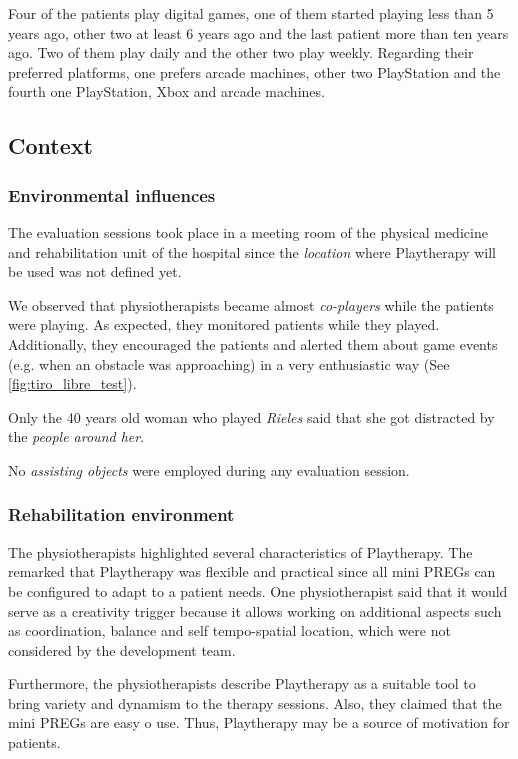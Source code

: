 Four of the patients play digital games, one of them started playing less than 5 years ago, other two at least 6 years ago and the last patient more than ten years ago. Two of them play daily and the other two play weekly. Regarding their preferred platforms, one prefers arcade machines, other two PlayStation and the fourth one PlayStation, Xbox and arcade machines.

\subsection{Context}

\subsubsection{Environmental influences}
The evaluation sessions took place in a meeting room of the physical medicine and rehabilitation unit of the hospital since the \textit{location} where Playtherapy will be used was not defined yet.

We observed that physiotherapists became almost \textit{co-players} while the patients were playing. As expected, they monitored patients while they played. Additionally, they encouraged the patients and alerted them about game events (e.g. when an obstacle was approaching) in a very enthusiastic way (See \autoref{fig:tiro_libre_test}).

Only the 40 years old woman who played \textit{Rieles} said that she got distracted by the \textit{people around her}.

No \textit{assisting objects} were employed during any evaluation session.

\subsubsection{Rehabilitation environment}
The physiotherapists highlighted several characteristics of Playtherapy. The remarked that Playtherapy was flexible and practical since all mini \acp{PREG} can be configured to adapt to a patient needs. One physiotherapist said that it would serve as a creativity trigger because it allows working on additional aspects such as coordination, balance and self tempo-spatial location, which were not considered by the development team.

Furthermore, the physiotherapists describe Playtherapy as a suitable tool to bring variety and dynamism to the therapy sessions. Also, they claimed that the mini \acp{PREG} are easy o use. Thus, Playtherapy may be a source of motivation for patients.

